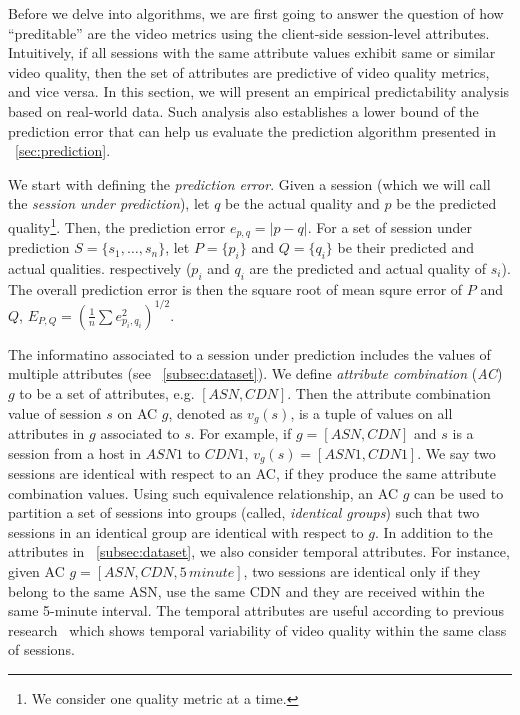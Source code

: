 Before we delve into algorithms, we are first going to answer the question of how ``preditable'' are the video metrics using the client-side session-level attributes. Intuitively, if all sessions with the same attribute values exhibit same or similar video quality, then the set of attributes are predictive of video quality metrics, and vice versa. In this section, we will present an empirical predictability analysis based on real-world data. Such analysis also establishes a lower bound of the prediction error that can help us evaluate the prediction algorithm presented in \Section~\ref{sec:prediction}.

\label{subsec:definitions}



 We start with defining the {\it prediction error}.  Given a session
(which we will call the {\it session under prediction}), let $q$ be
the actual quality and $p$ be the predicted quality\footnote{We consider one quality metric at a time.}. Then, the
prediction error $e_{p,q}=|p-q|$.
For a set of session under prediction $S=\{s_1,\dots,s_n\}$, let $P=\{p_i\}$ and $Q=\{q_i\}$ be their predicted and actual qualities. respectively ($p_i$ and $q_i$ are the predicted and actual quality of $s_i$). The overall prediction error is then the square root of mean squre error of $P$ and $Q$, $E_{P,Q}=\left(\frac{1}{n}\sum e_{p_i,q_i}^2\right)^{1/2}$.

 The informatino associated to a session under prediction includes the values of multiple attributes (see \Section~\ref{subsec:dataset}). We define {\it attribute combination} ({\it AC}) $g$ to be a set of attributes, e.g. $[ASN, CDN]$. Then the attribute combination value of session $s$ on AC $g$, denoted as $v_g(s)$, is a tuple of values on all attributes in $g$ associated to $s$. For example, if $g=[ASN,CDN]$ and $s$ is a session from a host in $ASN1$ to $CDN1$, $v_g(s)=[ASN1, CDN1]$. We say two sessions are identical with respect to an AC, if they produce the same attribute combination values. Using such equivalence relationship, an AC $g$ can be used to partition a set of sessions into groups (called, {\it identical groups}) such that two sessions in an identical group are identical with respect to $g$.
In addition to the attributes in \Section~\ref{subsec:dataset}, we also consider temporal attributes. For instance, given AC $g=[ASN, CDN, 5\,minute]$, two sessions are identical only if they belong to the same ASN, use the same CDN and they are received within the same 5-minute interval. The temporal attributes are useful according to previous research~\cite{sigcomm12} which shows temporal variability of video quality within the same class of sessions.


